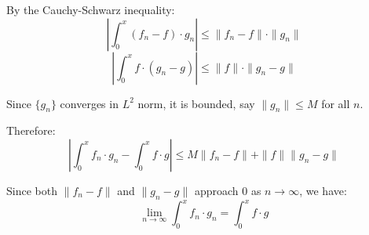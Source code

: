By the Cauchy-Schwarz inequality:
\[\left|\int_0^x (f_n - f) \cdot g_n\right| \leq \| f_n - f \| \cdot \| g_n \|\]
\[\left|\int_0^x f \cdot (g_n - g)\right| \leq \| f \| \cdot \| g_n - g \|\]

Since $\{g_n\}$ converges in $L^2$ norm, it is bounded, say $\| g_n \| \leq M$ for all $n$.

Therefore:
\[\left|\int_0^x f_n \cdot g_n - \int_0^x f \cdot g\right| \leq M \| f_n - f \| + \| f \| \| g_n - g \|\]

Since both $\| f_n - f \|$ and $\| g_n - g \|$ approach 0 as $n \to \infty$, we have:
\[\lim_{n \to \infty} \int_0^x f_n \cdot g_n = \int_0^x f \cdot g\]